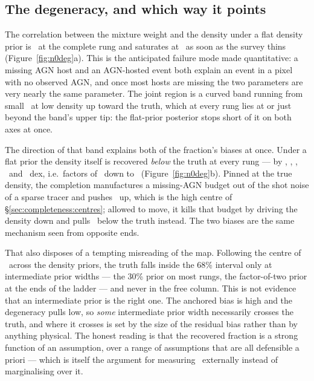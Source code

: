 

\subsection{The degeneracy, and which way it points}
\label{sec:density:degeneracy}

The correlation between the mixture weight and the density under a flat density
prior is \FreeCompleteRho\ at the complete rung and saturates at \FreeRhoMax\ as
soon as the survey thins (Figure~\ref{fig:n0deg}a). This is the anticipated
failure mode made quantitative: a missing AGN host and an AGN-hosted event both
explain an event in a pixel with no observed AGN, and once most hosts are
missing the two parameters are very nearly the same parameter. The joint region
is a curved band running from small \fagn\ at low density up toward the truth,
which at every rung lies at or just beyond the band's upper tip: the
flat-prior posterior stops short of it on both axes at once.

The direction of that band explains both of the fraction's biases at once. Under
a flat prior the density itself is recovered \emph{below} the truth at every
rung --- by \FreeCompleteNzeroOff, \FreeMtwentyoneNzeroOff,
\FreeMtwentyNzeroOff, \FreeMnineteenNzeroOff\ and \FreeMeighteenNzeroOff\ dex,
i.e.\ factors of \FreeCompletePrior\ down to \FreeMeighteenPrior\
(Figure~\ref{fig:n0deg}b). Pinned at the true density, the completion
manufactures a missing-AGN budget out of the shot noise of a sparse tracer and
pushes \fagn\ up, which is the high centre of \S\ref{sec:completeness:centres};
allowed to move, it kills that budget by driving the density down and pulls
\fagn\ below the truth instead. The two biases are the same mechanism seen from
opposite ends.

That also disposes of a tempting misreading of the map. Following the centre of
\fagn\ across the density priors, the truth falls inside the 68\% interval only
at intermediate prior widths --- the 30\% prior on most rungs, the
factor-of-two prior at the ends of the ladder --- and never in the free
column. This
is not evidence that an intermediate prior is the right one. The anchored bias
is high and the degeneracy pulls low, so \emph{some} intermediate prior width
necessarily crosses the truth, and where it crosses is set by the size of the
residual bias rather than by anything physical. The honest reading is that the
recovered fraction is a strong function of an assumption, over a range of
assumptions that are all defensible a priori --- which is itself the argument
for measuring \nzagn\ externally instead of marginalising over it.

